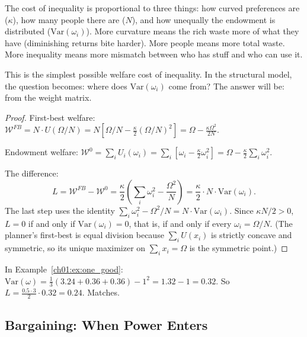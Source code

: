 \documentclass[../structural_economics_book.tex]{subfiles}
\begin{document}
\begin{intuition}
The cost of inequality is proportional to three things: how curved preferences are ($\kappa$), how many people there are ($N$), and how unequally the endowment is distributed ($\text{Var}(\omega_i)$). More curvature means the rich waste more of what they have (diminishing returns bite harder). More people means more total waste. More inequality means more mismatch between who has stuff and who can use it.

This is the simplest possible welfare cost of inequality. In the structural model, the question becomes: where does $\text{Var}(\omega_i)$ come from? The answer will be: from the weight matrix.
\end{intuition}

\begin{proof}
First-best welfare: $\mathcal{W}^{FB} = N \cdot U(\Omega/N) = N[\Omega/N - \frac{\kappa}{2}(\Omega/N)^2] = \Omega - \frac{\kappa\Omega^2}{2N}$.

Endowment welfare: $\mathcal{W}^{0} = \sum_i U_i(\omega_i) = \sum_i[\omega_i - \frac{\kappa}{2}\omega_i^2] = \Omega - \frac{\kappa}{2}\sum_i\omega_i^2$.

The difference:
\begin{equation}
L = \mathcal{W}^{FB} - \mathcal{W}^{0} = \frac{\kappa}{2}\left(\sum_i \omega_i^2 - \frac{\Omega^2}{N}\right) = \frac{\kappa}{2} \cdot N \cdot \text{Var}(\omega_i).
\end{equation}
The last step uses the identity $\sum_i \omega_i^2 - \Omega^2/N = N \cdot \text{Var}(\omega_i)$. Since $\kappa N/2 > 0$, $L = 0$ if and only if $\text{Var}(\omega_i) = 0$, that is, if and only if every $\omega_i = \Omega/N$. (The planner's first-best is equal division because $\sum_i U(x_i)$ is strictly concave and symmetric, so its unique maximizer on $\sum_i x_i = \Omega$ is the symmetric point.)
\end{proof}

\begin{example}
In Example~\ref{ch01:ex:one_good}: $\text{Var}(\omega) = \frac{1}{3}(3.24 + 0.36 + 0.36) - 1^2 = 1.32 - 1 = 0.32$. So $L = \frac{0.5 \cdot 3}{2} \cdot 0.32 = 0.24$. Matches.
\end{example}


\subsection{Bargaining: When Power Enters}
\end{document}
